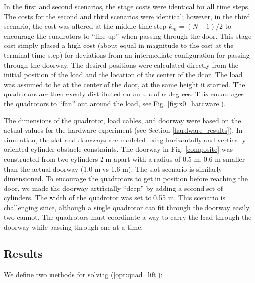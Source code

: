 \documentclass[../root.tex]{subfiles}
\begin{document}
In the first and second scenarios, the stage costs were identical for
all time steps. The costs for the second and third scenarios were
identical; however, in the third scenario, the cost was
altered at the middle time step $k_m = (N-1)/2$ to encourage the quadrotors
to ``line up'' when passing through the door. This stage cost simply placed a
high cost (about equal in magnitude to the cost at the terminal time step)
for deviations from an intermediate configuration for passing through the
doorway.
The desired positions were calculated directly from the initial position of
the load and the location of the center of the door. The load was assumed to
be at the center of the door, at the same height it started. The quadrotors
are then evenly distributed on an arc of $\alpha$ degrees. This encourages
the quadrotors to ``fan'' out around the load, see Fig.
\ref{fig:x0_hardware}). 

The dimensions of the quadrotor, load cables, and doorway were based
on the actual values for the hardware experiment (see Section
\ref{hardware_results}). In simulation, the slot and doorways are modeled
using horizontally and vertically oriented cylinder obstacle constraints. The
doorway in Fig. \ref{composite} was constructed from two cylinders 2 m apart
with a radius of 0.5 m, 0.6 m smaller than the actual doorway (1.0 m vs 1.6
m). The slot scenario is similarly dimensioned. To encourage the quadrotors
to get in position before reaching the door, we made the doorway artificially
``deep'' by adding a second set of cylinders. The width of the quadrotor was
set to 0.55 m. This scenario is challenging since, although a single
quadrotor can fit through the doorway easily, two cannot. The quadrotors must
coordinate a way to carry the load through the doorway while passing through
one at a time.


\subsection{Results}
We define two methods for solving (\ref{opt:quad_lift}):
\end{document}
